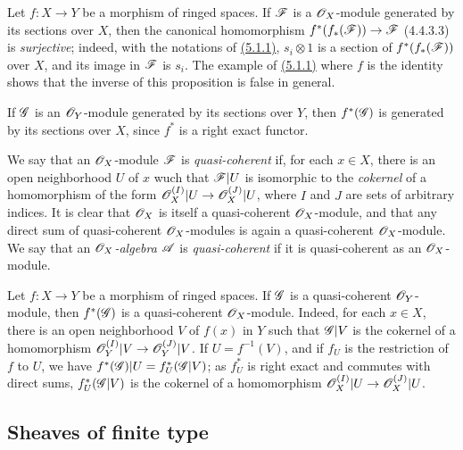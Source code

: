 \begin{env}[5.1.2]
\label{env-0.5.1.2}
Let $f:X\to Y$ be a morphism of ringed spaces. If $\mathscr{F}$ is a $\mathscr{O}_X$-module generated by
its sections over $X$, then the canonical homomorphism $f^*(f_*(\mathscr{F}))\to\mathscr{F}$ (4.4.3.3)
is {\em surjective}; indeed, with the notations of \hyperref[env-0.5.1.1]{(5.1.1)}, $s_i\otimes 1$ is a
section of $f^*(f_*(\mathscr{F}))$ over $X$, and its image in $\mathscr{F}$ is $s_i$. The example of
\hyperref[env-0.5.1.1]{(5.1.1)} where $f$ is the identity shows that the inverse of this proposition is
false in general.

If $\mathscr{G}$ is an $\mathscr{O}_Y$-module generated by its sections over $Y$, then $f^*(\mathscr{G})$ is
generated by its sections over $X$, since $f^*$ is a right exact functor.
\end{env}

\begin{env}[5.1.3]
\label{env-0.5.1.3}
We say that an $\mathscr{O}_X$-module $\mathscr{F}$ is {\em quasi-coherent} if, for each $x\in X$, there
is an open neighborhood $U$ of $x$ wuch that $\mathscr{F}|U$ is isomorphic to the {\em cokernel}
of a homomorphism of the form $\mathscr{O}_X^{(I)}|U\to\mathscr{O}_X^{(J)}|U$, where $I$ and $J$ are sets of
arbitrary indices. It is clear that $\mathscr{O}_X$ is itself a quasi-coherent $\mathscr{O}_X$-module, and
that any direct sum of quasi-coherent $\mathscr{O}_X$-modules is again a quasi-coherent
$\mathscr{O}_X$-module. We say that an {\em $\mathscr{O}_X$-algebra $\mathscr{A}$} is {\em quasi-coherent} if
it is quasi-coherent as an $\mathscr{O}_X$-module.
\end{env}

\begin{env}[5.1.4]
\label{env-0.5.1.4}
Let $f:X\to Y$ be a morphism of ringed spaces. If $\mathscr{G}$ is a quasi-coherent
$\mathscr{O}_Y$-module, then $f^*(\mathscr{G})$ is a quasi-coherent $\mathscr{O}_X$-module. Indeed, for each
$x\in X$, there is an open neighborhood $V$ of $f(x)$ in $Y$ such that $\mathscr{G}|V$ is the
cokernel of a homomorphism $\mathscr{O}_Y^{(I)}|V\to\mathscr{O}_Y^{(J)}|V$. If $U=f^{-1}(V)$, and if $f_U$ is
the restriction of $f$ to $U$, we have $f^*(\mathscr{G})|U=f_U^*(\mathscr{G}|V)$; as $f_U^*$ is right
exact and commutes with direct sums, $f_U^*(\mathscr{G}|V)$ is the cokernel of a homomorphism
$\mathscr{O}_X^{(I)}|U\to\mathscr{O}_X^{(J)}|U$.
\end{env}

\subsection{Sheaves of finite type}
\label{subsection-sheaves-of-finite-type}

